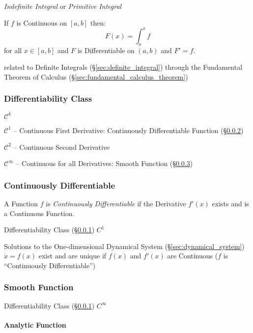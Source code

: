 \emph{Indefinite Integral} or \emph{Primitive Integral}

If $f$ is Continuous on $[a,b]$ then:
\[
  F(x) = \int_a^x f
\]
for all $x \in [a,b]$ and $F$ is Differentiable on $(a,b)$ and $F' = f$.

\fist related to Definite Integrals (\S\ref{sec:definite_integral}) through the
Fundamental Theorem of Calculus (\S\ref{sec:fundamental_calculus_theorem})



\subsubsection{Differentiability Class}\label{sec:differentiability_class}

$\mathcal{C}^k$

$\mathcal{C}^1$ -- Continuous First Derivative: Continuously Differentiable
Function (\S\ref{sec:continuously_differentiable})

$\mathcal{C}^2$ -- Continuous Second Derivative

$\mathcal{C}^\infty$ -- Continuous for all Derivatives: Smooth Function
(\S\ref{sec:smooth_function})



\subsubsection{Continuously Differentiable}
\label{sec:continuously_differentiable}

A Function $f$ is \emph{Continuously Differentiable} if the Derivative $f'(x)$
exists and is a Continuous Function.

Differentiability Class (\S\ref{sec:differentiability_class}) $C^1$

Solutions to the One-dimensional Dynamical System
(\S\ref{sec:dynamical_system}) $\dot{x} = f(x)$ exist and are unique if $f(x)$
and $f'(x)$ are Continuous ($f$ is ``Continuously Differentiable'')



\subsubsection{Smooth Function}\label{sec:smooth_function}

Differentiability Class (\S\ref{sec:differentiability_class}) $C^{\infty}$



\paragraph{Analytic Function}\label{sec:analytic_function}\hfill

